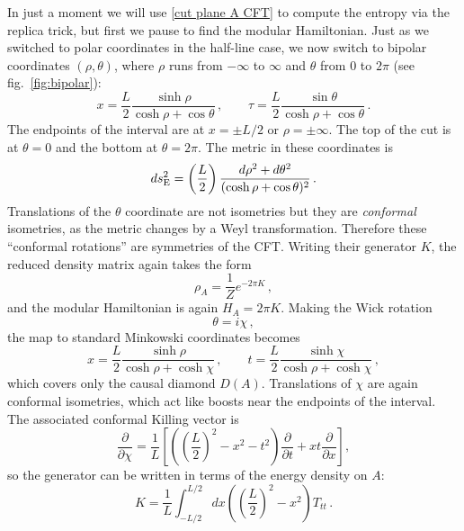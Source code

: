 \documentclass[11pt]{article}
\newcommand{\pd}[2]{\frac{\partial #1}{\partial #2}}
\begin{document}
In just a moment we will use \eqref{cut plane A CFT} to compute the entropy via the replica trick, but first we pause to find the modular Hamiltonian. Just as we switched to polar coordinates in the half-line case, we now switch to bipolar coordinates $(\rho,\theta)$, where $\rho$ runs from $-\infty$ to $\infty$ and $\theta$ from 0 to $2\pi$ (see fig.\ \ref{fig:bipolar}):
\begin{equation}\label{bipolar}
x = \frac L2\frac{\sinh\rho}{\cosh\rho+\cos\theta}\,,\qquad
\tau = \frac L2\frac{\sin\theta}{\cosh\rho+\cos\theta}\,.
\end{equation}
The endpoints of the interval are at $x=\pm L/2$ or $\rho=\pm\infty$. The top of the cut is at $\theta=0$ and the bottom at $\theta=2\pi$. The metric in these coordinates is
\begin{equation}
ds^2_{\rm E} = \left(\frac L2\right)\frac{d\rho^2+d\theta^2}{(\cosh\rho+\cos\theta)^2}\,.
\end{equation}
Translations of the $\theta$ coordinate are not isometries but they are \emph{conformal} isometries, as the metric changes by a Weyl transformation. Therefore these ``conformal rotations'' are symmetries of the CFT. Writing their generator $K$, the reduced density matrix again takes the form
\begin{equation}
\rho_A = \frac1Ze^{-2\pi K}\,,
\end{equation}
and the modular Hamiltonian is again $H_A=2\pi K$. Making the Wick rotation
\begin{equation}
\theta = i\chi\,,
\end{equation}
the map to standard Minkowski coordinates becomes
\begin{equation}\label{bipolarL}
x = \frac L2\frac{\sinh\rho}{\cosh\rho+\cosh\chi}\,,\qquad
t = \frac L2\frac{\sinh\chi}{\cosh\rho+\cosh\chi}\,,
\end{equation}
which covers only the causal diamond $D(A)$. Translations of $\chi$ are again conformal isometries, which act like boosts near the endpoints of the interval. The associated conformal Killing vector is
\begin{equation}
\pd{}{\chi} = \frac1L\left[\left(\left(\frac L2\right)^2-x^2-t^2\right)\pd{}{t}+xt\pd{}{x}\right],
\end{equation}
so the generator can be written in terms of the energy density on $A$:
\begin{equation}
K = \frac1L\int_{-L/2}^{L/2}dx\left(\left(\frac L2\right)^2-x^2\right)T_{tt}\,.
\end{equation}
\end{document}
